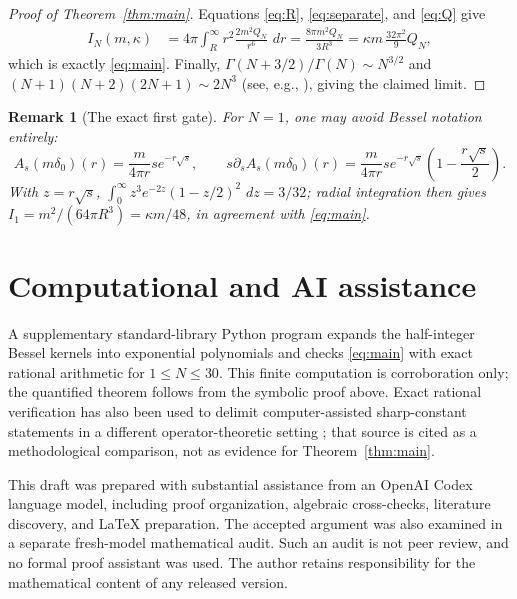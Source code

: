 \documentclass[11pt]{article}
\newtheorem{remark}[theorem]{Remark}
\newcommand{\dd}{\,d}
\begin{document}
\begin{proof}[Proof of Theorem~\ref{thm:main}]
Equations \eqref{eq:R}, \eqref{eq:separate}, and \eqref{eq:Q} give
\begin{align*}
 I_N(m,\kappa)
 &=4\pi\int_R^\infty r^2\frac{2m^2Q_N}{r^6}\,\dd r
 =\frac{8\pi m^2Q_N}{3R^3}
 =\kappa m\,\frac{32\pi^2}{9}Q_N,
\end{align*}
which is exactly \eqref{eq:main}.  Finally,
$\Gamma(N+3/2)/\Gamma(N)\sim N^{3/2}$ and
$(N+1)(N+2)(2N+1)\sim2N^3$ (see, e.g., \cite[Ch.~5]{NIST}), giving the
claimed limit.
\end{proof}

\begin{remark}[The exact first gate]
For $N=1$, one may avoid Bessel notation entirely:
\[
 A_s(m\delta_0)(r)=\frac{m}{4\pi r}se^{-r\sqrt{s}},\qquad
 s\partial_sA_s(m\delta_0)(r)=
 \frac{m}{4\pi r}se^{-r\sqrt{s}}\left(1-\frac{r\sqrt{s}}2\right).
\]
With $z=r\sqrt{s}$,
$\int_0^\infty z^3e^{-2z}(1-z/2)^2\,\dd z=3/32$; radial integration then
gives $I_1=m^2/(64\pi R^3)=\kappa m/48$, in agreement with
\eqref{eq:main}.
\end{remark}

\section*{Computational and AI assistance}

A supplementary standard-library Python program expands the half-integer
Bessel kernels into exponential polynomials and checks \eqref{eq:main} with
exact rational arithmetic for $1\leq N\leq30$.  This finite computation is
corroboration only; the quantified theorem follows from the symbolic proof
above.  Exact rational verification has also been used to delimit
computer-assisted sharp-constant statements in a different
operator-theoretic setting \cite{ZengLens}; that source is cited as a
methodological comparison, not as evidence for Theorem~\ref{thm:main}.

This draft was prepared with substantial assistance from an OpenAI Codex
language model, including proof organization, algebraic cross-checks,
literature discovery, and LaTeX preparation.  The accepted argument was also
examined in a separate fresh-model mathematical audit.  Such an audit is not
peer review, and no formal proof assistant was used.  The author retains
responsibility for the mathematical content of any released version.



\end{document}
